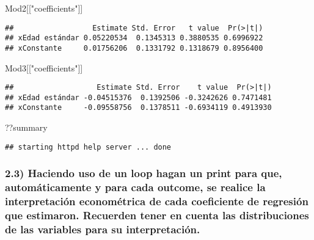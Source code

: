 \documentclass[
]{article}
\newenvironment{Shaded}{\begin{snugshade}}{\end{snugshade}}
\newcommand{\NormalTok}[1]{#1}
\newcommand{\StringTok}[1]{\textcolor[rgb]{0.31,0.60,0.02}{#1}}
\begin{document}
\begin{Shaded}
\begin{Highlighting}[]
\NormalTok{Mod2[[}\StringTok{"coefficients"}\NormalTok{]]}
\end{Highlighting}
\end{Shaded}

\begin{verbatim}
##                  Estimate Std. Error   t value  Pr(>|t|)
## xEdad estándar 0.05220534  0.1345313 0.3880535 0.6996922
## xConstante     0.01756206  0.1331792 0.1318679 0.8956400
\end{verbatim}

\begin{Shaded}
\begin{Highlighting}[]
\NormalTok{Mod3[[}\StringTok{"coefficients"}\NormalTok{]]}
\end{Highlighting}
\end{Shaded}

\begin{verbatim}
##                   Estimate Std. Error    t value  Pr(>|t|)
## xEdad estándar -0.04515376  0.1392506 -0.3242626 0.7471481
## xConstante     -0.09558756  0.1378511 -0.6934119 0.4913930
\end{verbatim}

\begin{Shaded}
\begin{Highlighting}[]
\NormalTok{??summary}
\end{Highlighting}
\end{Shaded}

\begin{verbatim}
## starting httpd help server ... done
\end{verbatim}

\hypertarget{haciendo-uso-de-un-loop-hagan-un-print-para-que-automuxe1ticamente-y-para-cada-outcome-se-realice-la-interpretaciuxf3n-economuxe9trica-de-cada-coeficiente-de-regresiuxf3n-que-estimaron.-recuerden-tener-en-cuenta-las-distribuciones-de-las-variables-para-su-interpretaciuxf3n.}{%
\subsubsection{2.3) Haciendo uso de un loop hagan un print para que,
automáticamente y para cada outcome, se realice la interpretación
econométrica de cada coeficiente de regresión que estimaron. Recuerden
tener en cuenta las distribuciones de las variables para su
interpretación.}\label{haciendo-uso-de-un-loop-hagan-un-print-para-que-automuxe1ticamente-y-para-cada-outcome-se-realice-la-interpretaciuxf3n-economuxe9trica-de-cada-coeficiente-de-regresiuxf3n-que-estimaron.-recuerden-tener-en-cuenta-las-distribuciones-de-las-variables-para-su-interpretaciuxf3n.}}
\end{document}
